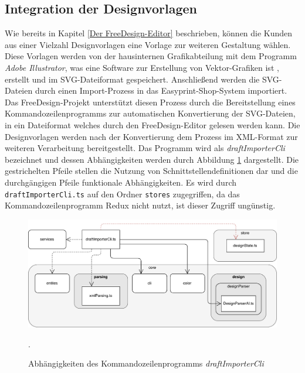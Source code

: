 \subsection{Integration der Designvorlagen}
\label{Kommandozeilenprogramme}
Wie bereits in Kapitel \ref{Der FreeDesign-Editor} beschrieben, können die Kunden aus einer Vielzahl Designvorlagen eine Vorlage zur weiteren Gestaltung wählen. 
Diese Vorlagen werden von der hausinternen Grafikabteilung mit dem Programm \emph{Adobe Illustrator}, was eine Software zur Erstellung von Vektor-Grafiken ist \autocite[vgl.][]{Adobe:Illustrator}, erstellt und im SVG-Dateiformat gespeichert. Anschließend werden die SVG-Dateien durch einen Import-Prozess in das Easyprint-Shop-System importiert. Das FreeDesign-Projekt unterstützt diesen Prozess durch die Bereitstellung eines Kommandozeilenprogramms zur automatischen Konvertierung der SVG-Dateien, in ein Dateiformat welches durch den FreeDesign-Editor gelesen werden kann. Die Designvorlagen werden nach der Konvertierung dem Prozess im XML-Format zur weiteren Verarbeitung bereitgestellt. 
Das Programm wird als \emph{draftImporterCli} bezeichnet und dessen Abhängigkeiten werden durch Abbildung \ref{fig:DesignImport} dargestellt.
Die gestrichelten Pfeile stellen die Nutzung von Schnittstellendefinitionen dar und die durchgängigen Pfeile funktionale Abhängigkeiten. Es wird durch \lstinline|draftImporterCli.ts| auf den Ordner \lstinline|stores| zugegriffen, da das Kommandozeilenprogramm Redux nicht nutzt, ist dieser Zugriff ungünstig.


\begin{figure}[H]
    \centering
    \includegraphics[width=.9\textwidth]{diagrams/Ist-Architektur/draftImporter-analysis.pdf}
    \caption{Abhängigkeiten des Kommandozeilenprogramms \emph{draftImporterCli}}.
    \label{fig:DesignImport}
\end{figure}

